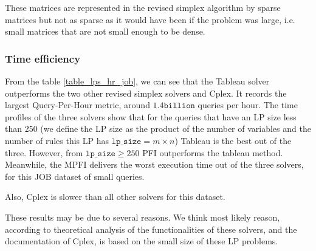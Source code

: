 These matrices are represented
in the revised simplex algorithm by
sparse matrices but not as sparse as it would have been if the problem was large, i.e.
small matrices that are not small enough to be dense.

\subsubsection{Time efficiency}
From the table \ref{table_lps_hr_job}, we can see that the Tableau solver
outperforms the two other revised simplex solvers and Cplex. It records
the largest Query-Per-Hour metric, around $ 1.4 \texttt{billion}$ queries per hour.
The time profiles of the three solvers show that for the queries that have
an LP size less than 250 (we define the LP size as the product of the number 
of variables and the number of rules this LP has $\texttt{lp\_size} = m \times n$)
Tableau is the best out of the three. 
However, from $\texttt{lp\_size} \geq 250$ PFI outperforms the tableau method.
Meanwhile, the MPFI delivers the worst execution time out of the three solvers, for
this JOB dataset of small queries. 

Also, Cplex is slower than all other solvers for this dataset.

These results may be due to several reasons. We think most likely reason,
according to theoretical analysis of the functionalities of these solvers, and the documentation
of Cplex, is based on the small size of these LP problems.

